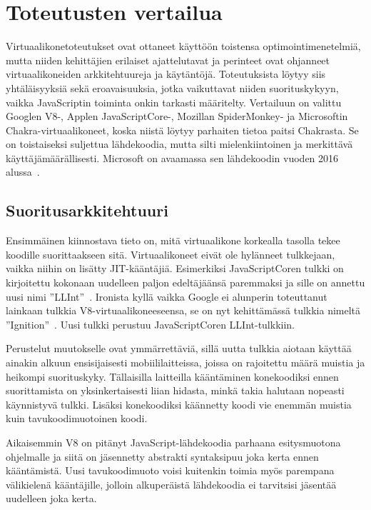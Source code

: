 \pagebreak
\section{Toteutusten vertailua}

Virtuaalikonetoteutukset ovat ottaneet käyttöön toistensa optimointimenetelmiä, mutta niiden kehittäjien erilaiset ajattelutavat ja perinteet ovat ohjanneet virtuaalikoneiden arkkitehtuureja ja käytäntöjä. Toteutuksista löytyy siis yhtäläisyyksiä sekä eroavaisuuksia, jotka vaikuttavat niiden suorituskykyyn, vaikka JavaScriptin toiminta onkin tarkasti määritelty. Vertailuun on valittu Googlen V8-, Applen JavaScriptCore-, Mozillan SpiderMonkey- ja Microsoftin Chakra-virtuaalikoneet, koska niistä löytyy parhaiten tietoa paitsi Chakrasta. Se on toistaiseksi suljettua lähdekoodia, mutta silti mielenkiintoinen ja merkittävä käyttäjämäärällisesti. Microsoft on avaamassa sen lähdekoodin vuoden 2016 alussa~\cite{chakraopen}.

\subsection{Suoritusarkkitehtuuri}

Ensimmäinen kiinnostava tieto on, mitä virtuaalikone korkealla tasolla tekee koodille suorittaakseen sitä. Virtuaalikoneet eivät ole hylänneet tulkkejaan, vaikka niihin on lisätty JIT-kääntäjiä. Esimerkiksi JavaScriptCoren tulkki on kirjoitettu kokonaan uudelleen paljon edeltäjäänsä paremmaksi ja sille on annettu uusi nimi ''LLInt''~\cite{llint}. Ironista kyllä vaikka Google ei alunperin toteuttanut lainkaan tulkkia V8-virtuaalikoneeseensa, se on nyt kehittämässä tulkkia nimeltä ''Ignition''~\cite{v8ignition}. Uusi tulkki perustuu JavaScriptCoren LLInt-tulkkiin.

Perustelut muutokselle ovat ymmärrettäviä, sillä uutta tulkkia aiotaan käyttää ainakin alkuun ensisijaisesti mobiililaitteissa, joissa on rajoitettu määrä muistia ja heikompi suorituskyky. Tällaisilla laitteilla kääntäminen konekoodiksi ennen suorittamista on yksinkertaisesti liian hidasta, minkä takia halutaan nopeasti käynnistyvä tulkki. Lisäksi konekoodiksi käännetty koodi vie enemmän muistia kuin tavukoodimuotoinen koodi.

Aikaisemmin V8 on pitänyt JavaScript-lähdekoodia parhaana esitysmuotona ohjelmalle ja siitä on jäsennetty abstrakti syntaksipuu joka kerta ennen kääntämistä. Uusi tavukoodimuoto voisi kuitenkin toimia myös parempana välikielenä kääntäjille, jolloin alkuperäistä lähdekoodia ei tarvitsisi jäsentää uudelleen joka kerta.

